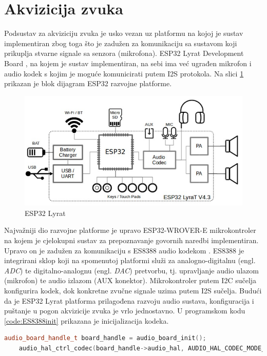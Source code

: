 \section{Akvizicija zvuka}
\label{sec:acq}

Podsustav za akviziciju zvuka je usko vezan uz platformu na kojoj
je sustav implementiran zbog toga što je zadužen za komunikaciju 
sa sustavom koji prikuplja stvarne signale sa senzora (mikrofona).
ESP32 Lyrat Development Board \cite{lyrat}, na kojem je sustav
implementiran, na sebi ima već ugrađen mikrofon i audio kodek
s kojim je moguće komunicirati putem I2S protokola. Na slici
\ref{pic:esp} prikazan je blok dijagram ESP32 razvojne platforme.

\begin{figure}[htb]
    \centering
    \includegraphics[width=0.75\linewidth]{Chapters/struktura_sustava/akvizicija/lyrat.png} 
    \caption{ESP32 Lyrat \cite{lyrat}}
    \label{pic:esp}
\end{figure}

Najvažniji dio razvojne platforme je upravo ESP32-WROVER-E mikrokontroler
na kojem je cjelokupni sustav za prepoznavanje govornih naredbi 
implementiran. Upravo on je zadužen za komunikaciju s ES8388 
audio kodekom \cite{es8388}. ES8388 je integrirani sklop koji na spomenutoj
platformi služi za analogno-digitalnu (engl. \textit{ADC}) te digitalno-analognu 
(engl. \textit{DAC}) pretvorbu, tj. upravljanje audio ulazom (mikrofon) te audio
izlazom (AUX konektor). Mikrokontroler putem I2C sučelja konfigurira kodek,
dok konkretne zvučne signale uzima putem I2S sučelja. Budući da je ESP32 Lyrat
platforma prilagođena razvoju audio sustava, konfiguracija i puštanje u pogon
akvizicije zvuka je vrlo jednostavno. U programskom kodu \ref{code:ES8388init}
prikazana je inicijalizacija kodeka.\\

\begin{lstlisting}[language=C++, caption=Inicijalizacija kodeka, label=code:ES8388init]
    audio_board_handle_t board_handle = audio_board_init();
    audio_hal_ctrl_codec(board_handle->audio_hal, AUDIO_HAL_CODEC_MODE_ENCODE, AUDIO_HAL_CTRL_START);
\end{lstlisting}

